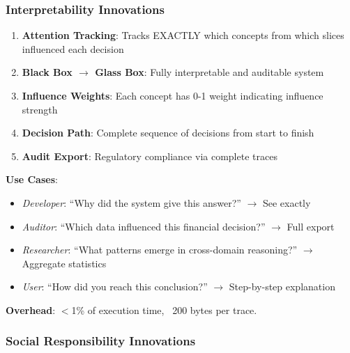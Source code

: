 \documentclass[11pt]{article}
\begin{document}
\subsubsection{Interpretability Innovations}

\begin{enumerate}
    \item \textbf{Attention Tracking}: Tracks EXACTLY which concepts from which slices influenced each decision
    \item \textbf{Black Box $\rightarrow$ Glass Box}: Fully interpretable and auditable system
    \item \textbf{Influence Weights}: Each concept has 0-1 weight indicating influence strength
    \item \textbf{Decision Path}: Complete sequence of decisions from start to finish
    \item \textbf{Audit Export}: Regulatory compliance via complete traces
\end{enumerate}

\textbf{Use Cases}:
\begin{itemize}
    \item \textit{Developer}: ``Why did the system give this answer?'' $\rightarrow$ See exactly
    \item \textit{Auditor}: ``Which data influenced this financial decision?'' $\rightarrow$ Full export
    \item \textit{Researcher}: ``What patterns emerge in cross-domain reasoning?'' $\rightarrow$ Aggregate statistics
    \item \textit{User}: ``How did you reach this conclusion?'' $\rightarrow$ Step-by-step explanation
\end{itemize}

\textbf{Overhead}: $<$1\% of execution time, ~200 bytes per trace.

\subsubsection{Social Responsibility Innovations}
\end{document}
